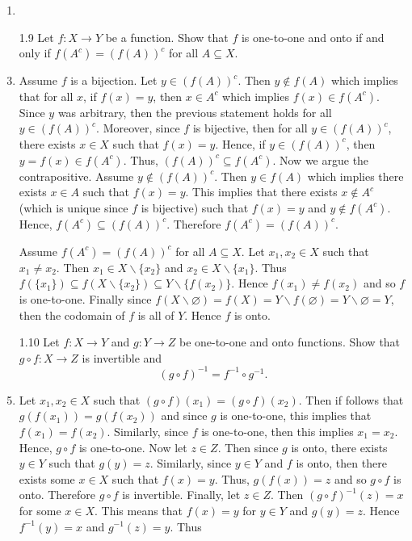\documentclass[12pt]{article}
\makeatletter
\theoremstyle{definition}
\theoremstyle{remark}
\renewenvironment{proof}[1][\proofname]{\par
  \pushQED{\qed}%
  \normalfont \topsep6\p@\@plus6\p@\relax
  \list{}{\leftmargin=0mm
          \rightmargin=4mm
          \settowidth{\itemindent}{\itshape#1}%
          \labelwidth=\itemindent
          \parsep=0pt \listparindent=\parindent 
  }
  \item[\hskip\labelsep
        \itshape
    #1\@addpunct{.}]\ignorespaces
}{%
  \popQED\endlist\@endpefalse
}
\let\oldproofname=\proofname
\renewcommand{\proofname}{\bf{\textit{\oldproofname}}}
\makeatother
\begin{document}
\begin{enumerate}[leftmargin=*]
\begin{proof}
            \end{proof}
        \item[1.9] Let $f\colon X\rightarrow Y$ be a function. Show that $f$ is one-to-one and onto if and only if $f(A^c)=(f(A))^c$ for all $A\subseteq X$.
            \begin{proof}
                Assume $f$ is a bijection. Let $y\in (f(A))^c$. Then $y\notin f(A)$ which implies that for all $x$, if $f(x)=y$, then $x\in A^c$ which implies $f(x)\in f(A^c)$. Since $y$ was arbitrary, then the previous statement holds for all $y\in (f(A))^c$. Moreover, since $f$ is bijective, then for all $y\in (f(A))^c$, there exists $x\in X$ such that $f(x)=y$. Hence, if $y\in(f(A))^c$, then $y=f(x)\in f(A^c)$. Thus, $(f(A))^c\subseteq f(A^c)$. Now we argue the contrapositive. Assume $y\notin(f(A))^c$. Then $y\in f(A)$ which implies there exists $x\in A$ such that $f(x)=y$. This implies that there exists $x\notin A^c$ (which is unique since $f$ is bijective) such that $f(x)=y$ and $y\notin f(A^c)$. Hence, $f(A^c)\subseteq (f(A))^c$. Therefore $f(A^c)=(f(A))^c$.\par\hspace{4mm} Assume $f(A^c)=(f(A))^c$ for all $A\subseteq X$. Let $x_1,x_2\in X$ such that $x_1\neq x_2$. Then $x_1\in X\backslash\{x_2\}$ and $x_2\in X\backslash\{x_1\}$. Thus $f(\{x_1\})\subseteq f(X\backslash\{x_2\})\subseteq Y\backslash\{f(x_2)\}$. Hence $f(x_1)\neq f(x_2)$ and so $f$ is one-to-one. Finally since $f(X\backslash\varnothing)=f(X)=Y\backslash f(\varnothing)=Y\backslash\varnothing= Y$, then the codomain of $f$ is all of $Y$. Hence $f$ is onto.
            \end{proof}
        \item[1.10] Let $f\colon X\rightarrow Y$ and $g\colon Y\rightarrow Z$ be one-to-one and onto functions. Show that $g\circ f\colon X\rightarrow Z$ is invertible and 
            \begin{equation*}
                (g\circ f)^{-1}=f^{-1}\circ g^{-1}.
            \end{equation*}
            \begin{proof}
                Let $x_1,x_2\in X$ such that $(g\circ f)(x_1)=(g\circ f)(x_2)$. Then if follows that $g(f(x_1))=g(f(x_2))$ and since $g$ is one-to-one, this implies that $f(x_1)=f(x_2)$. Similarly, since $f$ is one-to-one, then this implies $x_1=x_2$. Hence, $g\circ f$ is one-to-one. Now let $z\in Z$. Then since $g$ is onto, there exists $y\in Y$ such that $g(y)=z$. Similarly, since $y\in Y$ and $f$ is onto, then there exists some $x\in X$ such that $f(x)=y$. Thus, $g(f(x))=z$ and so $g\circ f$ is onto. Therefore $g\circ f$ is invertible. Finally, let $z\in Z$. Then $(g\circ f)^{-1}(z)=x$ for some $x\in X$. This means that $f(x)=y$ for $y\in Y$ and $g(y)=z$. Hence $f^{-1}(y)=x$ and $g^{-1}(z)=y$. Thus

\end{proof}
\end{enumerate}
\end{document}
